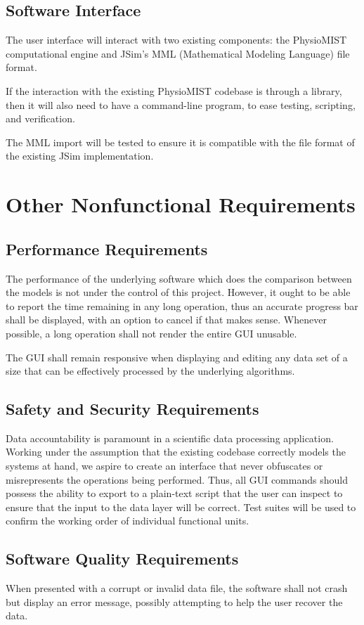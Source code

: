 \documentclass{article}
\begin{document}
\subsection{Software Interface}
The user interface will interact with two existing components: the PhysioMIST computational engine and JSim's MML (Mathematical Modeling Language) file format.

If the interaction with the existing PhysioMIST codebase is through a library, then it will also need to have a command-line program, to ease testing, scripting, and verification.

The MML import will be tested to ensure it is compatible with the file format of the existing JSim implementation.

\section{Other Nonfunctional Requirements}
\subsection{Performance Requirements}
The performance of the underlying software which does the comparison between the models is not under the control of this project. However, it ought to be able to report the time remaining in any long operation, thus an accurate progress bar shall be displayed, with an option to cancel if that makes sense. Whenever possible, a long operation shall not render the entire GUI unusable.

The GUI shall remain responsive when displaying and editing any data set of a size that can be effectively processed by the underlying algorithms.

\subsection{Safety and Security Requirements}
Data accountability is paramount in a scientific data processing application. Working under the assumption that the existing codebase correctly models the systems at hand, we aspire to create an interface that never obfuscates or misrepresents the operations being performed. Thus, all GUI commands should possess the ability to export to a plain-text script that the user can inspect to ensure that the input to the data layer will be correct. Test suites will be used to confirm the working order of individual functional units.

\subsection{Software Quality Requirements}

When presented with a corrupt or invalid data file, the software shall not crash but display an error message, possibly attempting to help the user recover the data.
\end{document}
